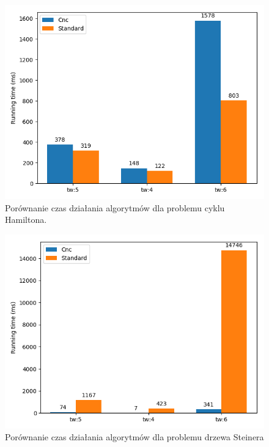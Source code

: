 \documentclass[12pt, oneside]{report}
\begin{document}
\begin{figure}
\centering
\includegraphics[width=16cm]{hamiltonian_test_time.png}
\caption{Porównanie czas działania algorytmów dla problemu cyklu Hamiltona.}
\label{hamiltonian_test_time}
\end{figure}
 
\begin{figure}
\centering
\includegraphics[width=16cm]{steiner_test_time.png}
\caption{Porównanie czas działania algorytmów dla problemu drzewa Steinera}
\label{steiner_test_time}
\end{figure}
\end{document}
